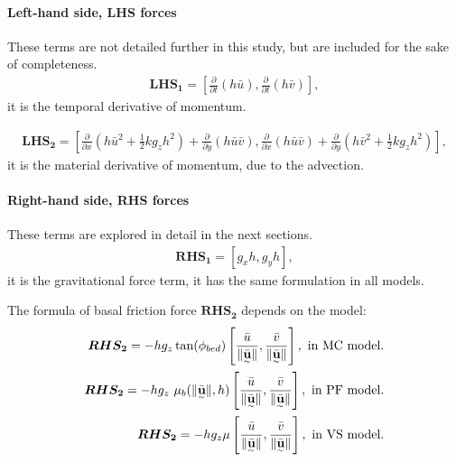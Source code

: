 \documentclass{article}
\begin{document}
\paragraph{Left-hand side, LHS forces}
These terms are not detailed further in this study, but are included for the sake of completeness.
\begin{align}
\boldsymbol{LHS_1} = \left[\frac{\partial}{\partial t} (h\bar{u}), \frac{\partial}{\partial t} (h\bar{v})\right],
\end{align}
it is the temporal derivative of momentum.

\begin{align}
\boldsymbol{LHS_2} = \left[\frac{\partial}{\partial x}\left(h\bar{u}^2 + \frac{1}{2}k g_{z}h^2\right) + \frac{\partial}{\partial y}(h\bar{u}\bar{v}),\frac{\partial}{\partial x}(h\bar{u}\bar{v}) +
\frac{\partial}{\partial y}\left(h\bar{v}^2 + \frac{1}{2}k g_{z}h^2\right)\right],
\end{align}
it is the material derivative of momentum, due to the advection.

\paragraph{Right-hand side, RHS forces}
These terms are explored in detail in the next sections.
\begin{align}
\boldsymbol{RHS_1} = [g_x h,g_y h],
\end{align}
it is the gravitational force term, it has the same formulation in all models.

The formula of basal friction force $\boldsymbol{RHS_2}$ depends on the model:
\begin{align}
\boldsymbol{RHS_2} = -h g_z\tan(\phi_{bed})\left[\frac{\bar{u}}{\| \underset{^\sim}{\bar{\textbf u}} \|}, \frac{\bar{v}}{\| \underset{^\sim}{\bar{\textbf u}} \|} \right],\textmd{ in MC model.}\nonumber\\
\boldsymbol{RHS_2} = - h g_z \ \mu_{b}(\|\underset{^\sim}{\bar{\textbf{u}}} \| , h)\left[\frac{\bar{u}}{\| \underset{^\sim}{\bar{\textbf{u}}} \|}, \frac{\bar{v}}{\| \underset{^\sim}{\bar{\textbf{u}}} \|}\right],\textmd{ in PF model.}\\
\boldsymbol{RHS_2} = -h g_{z} \mu\left[\frac{\bar{u}}{\| \underset{^\sim}{\bar{\textbf u}}\|} , \frac{\bar{v}}{\| \underset{^\sim}{\bar{\textbf u}}\|}\right],\textmd{ in VS model.}\nonumber
\end{align}
\end{document}
